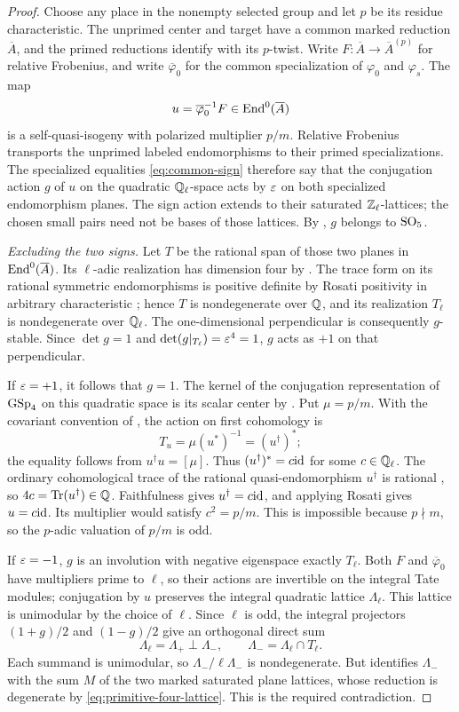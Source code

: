 \begin{proof}
Choose any place in the nonempty selected group and let $p$ be its
residue characteristic.  The unprimed center and target have a common
marked reduction $\overline A$, and the primed reductions identify with
its $p$-twist.  Write $F:\overline A\to\overline A^{(p)}$ for relative
Frobenius, and write $\overline\varphi_0$ for the common specialization of
$\varphi_0$ and $\varphi_s$.  The map
\[
 u=\overline\varphi_0^{-1}F\in\operatorname{End}^0(\overline A)
\]
is a self-quasi-isogeny with polarized multiplier $p/m$.  Relative
Frobenius transports the unprimed labeled endomorphisms to their primed
specializations.  The specialized equalities \eqref{eq:common-sign}
therefore say that the conjugation action $g$ of $u$ on the quadratic
$\mathbb Q_\ell$-space acts by $\varepsilon$ on both specialized endomorphism planes.
The sign action extends to their saturated $\mathbb Z_\ell$-lattices; the
chosen small pairs need not be bases of those lattices.
By , $g$ belongs to $\operatorname{SO}_5$.

\emph{Excluding the two signs.}
Let $T$ be the rational span of those two planes in
$\operatorname{End}^0(\overline A)$.  Its $\ell$-adic realization has dimension four by
.  The trace form on its rational symmetric
endomorphisms is positive definite by Rosati positivity in arbitrary
characteristic \cite[Theorem~17.3]{Milne1986}; hence $T$ is nondegenerate
over $\mathbb Q$, and its realization
$T_\ell$ is nondegenerate over $\mathbb Q_\ell$.  The one-dimensional perpendicular
is consequently $g$-stable.  Since $\det g=1$ and
$\det(g|_{T_\ell})=\varepsilon^4=1$, $g$ acts as $+1$ on that perpendicular.

If $\varepsilon=+1$, it follows that $g=1$.  The kernel of the conjugation
representation of $\operatorname{GSp}_4$ on this quadratic space is its scalar center
by .  Put $\mu=p/m$.  With the covariant convention
of , the action on first cohomology is
\[
 T_u=\mu(u^*)^{-1}=(u^\dagger)^*;
\]
the equality follows from $u^\dagger u=[\mu]$.  Thus
$(u^\dagger)^*=c\mathrm{id}$ for some $c\in\mathbb Q_\ell$.  The ordinary
cohomological trace of the rational quasi-endomorphism $u^\dagger$
is rational \cite[Proposition~12.9]{Milne1986}, so
$4c=\operatorname{Tr}(u^\dagger)\in\mathbb Q$.  Faithfulness gives
$u^\dagger=c\mathrm{id}$, and applying Rosati gives $u=c\mathrm{id}$.
Its multiplier would satisfy $c^2=p/m$.  This is impossible because
$p\nmid m$, so the $p$-adic valuation of $p/m$ is odd.

If $\varepsilon=-1$, $g$ is an involution with negative eigenspace exactly
$T_\ell$.  Both $F$ and $\overline\varphi_0$ have multipliers prime to
$\ell$, so their actions are invertible on the integral Tate modules;
conjugation by $u$ preserves the integral quadratic lattice
$\Lambda_\ell$.  This lattice is unimodular by the choice of $\ell$.
Since $\ell$ is odd, the integral projectors $(1+g)/2$ and $(1-g)/2$
give an orthogonal direct sum
\[
 \Lambda_\ell=\Lambda_+\perp\Lambda_-,
 \qquad \Lambda_-=\Lambda_\ell\cap T_\ell.
\]
Each summand is unimodular, so $\Lambda_-/\ell\Lambda_-$ is nondegenerate.
But  identifies $\Lambda_-$ with the sum $M$ of the
two marked saturated plane lattices, whose reduction is degenerate by
\eqref{eq:primitive-four-lattice}.  This is the required contradiction.


\end{proof}
